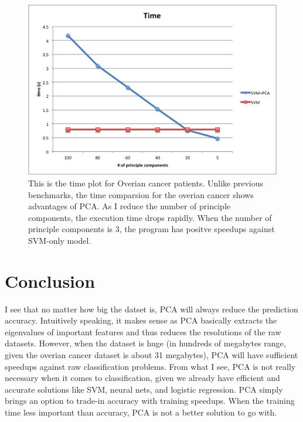 \documentclass[11pt]{article}
\begin{document}
\begin{figure}[H]
\centering
\includegraphics[width=120mm]{cancer_time.jpg}
\caption{ This is the time plot for Overian cancer patients. Unlike previous benchmarks, the time comparsion for the overian cancer shows advantages of PCA. As I reduce the number of principle components, the execution time drops rapidly. When the number of principle components is 3, the program has positve speedups against SVM-only model. \label{problem1Pic2}}
\end{figure}

\section{Conclusion}
I see that no matter how big the datset is, PCA will always reduce the prediction accuracy. Intuitively speaking, it makes sense as PCA basically extracts the eigenvalues of important features and thus reduces the resolutions of the raw datasets. However, when the dataset is huge (in hundreds of megabytes range, given the overian cancer dataset is about 31 megabytes), PCA will have sufficient speedups against raw classification problems. From what I see, PCA is not really necessary when it comes to classification, given we already have efficient and accurate solutions like SVM, neural nets, and logistic regression. PCA simply brings an option to trade-in accuracy with training speedups. When the training time less important than accuracy, PCA is not a better solution to go with. 
\end{document}
